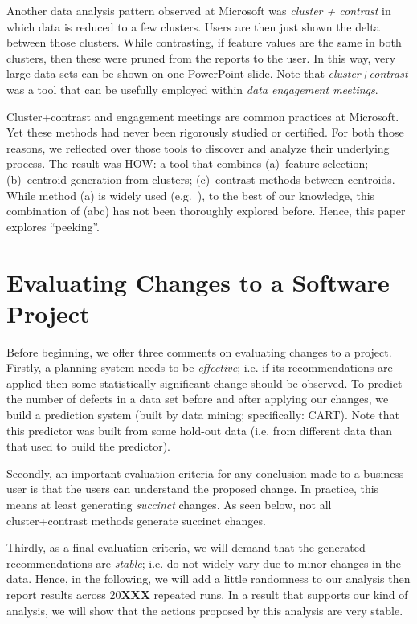 \documentclass[conference]{IEEEtran}
\begin{document}
	Another data analysis pattern observed
	at Microsoft was  {\em cluster + contrast} in which
	data is  reduced to a few
	clusters. Users are then just shown the delta between those
	clusters. While contrasting, if feature values are
	the same in both clusters, then these were pruned from
	the reports to the user. In this way, very large
	data sets can be shown on one PowerPoint
	slide. Note that {\em cluster+contrast} was a tool that can be usefully employed within
	{\em data engagement meetings}.
	
	
	Cluster+contrast and engagement
	meetings are common practices at Microsoft. Yet  these methods had never been rigorously studied or certified.
	For both those reasons,
	we reflected over those tools to discover and analyze their
	underlying process. The result was HOW: a tool
	that combines (a)~feature selection; (b)~centroid generation from   clusters;
	(c)~contrast methods between centroids.
	While method (a) is widely used (e.g.~\cite{Menzies2010}),
	to the best of our knowledge, this combination of (abc) has not been thoroughly explored before.
	Hence, this paper explores ``peeking''.
	
	\section{ Evaluating Changes to a Software Project}
	
Before beginning, we offer three comments on evaluating changes to a project.
Firstly, a planning system needs to be {\em effective}; i.e. if its recommendations
are applied then some statistically significant change should be observed.
To predict the number of defects in a data set before and after applying our changes,
we build a    prediction system (built by data mining; specifically: CART). Note that this
predictor was built from some hold-out data (i.e. from  different data than that used
to build the predictor).

Secondly, an important evaluation criteria for any conclusion made to a business user is that the users can understand the proposed change. In practice, this means at least
generating {\em succinct} changes. As seen below, not all cluster+contrast methods generate succinct changes.

Thirdly, as a final evaluation criteria, we will demand that the generated recommendations are {\em stable}; i.e. do not widely vary due to minor changes in the data. Hence, in the following, we will add a little randomness to our analysis then report results across 20{\bf XXX} repeated runs. In a result that supports our kind of analysis, we will show that the actions proposed by this analysis are very stable.
\end{document}
